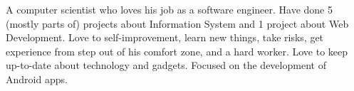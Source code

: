 

\begin{cvparagraph}

A computer scientist who loves his job as a software engineer. Have done 5 (mostly parts of) projects about Information System and 1 project about Web Development. Love to self-improvement, learn new things, take risks, get experience from step out of his comfort zone, and a hard worker. Love to keep up-to-date about technology and gadgets. Focused on the development of Android apps.
\end{cvparagraph}
